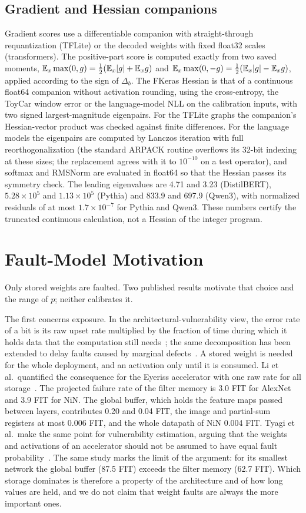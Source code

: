 \subsection{Gradient and Hessian companions}
Gradient scores use a differentiable companion with straight-through requantization (TFLite) or the decoded weights with fixed float32 scales (transformers). The positive-part score is computed exactly from two saved moments, $\mathbb{E}_x\max(0,g)=\tfrac12(\mathbb{E}_x|g|+\mathbb{E}_x g)$ and $\mathbb{E}_x\max(0,-g)=\tfrac12(\mathbb{E}_x|g|-\mathbb{E}_x g)$, applied according to the sign of $\Delta_b$. The FKeras Hessian is that of a continuous float64 companion without activation rounding, using the cross-entropy, the ToyCar window error or the language-model NLL on the calibration inputs, with two signed largest-magnitude eigenpairs. For the TFLite graphs the companion's Hessian-vector product was checked against finite differences. For the language models the eigenpairs are computed by Lanczos iteration with full reorthogonalization (the standard ARPACK routine overflows its 32-bit indexing at these sizes; the replacement agrees with it to $10^{-10}$ on a test operator), and softmax and RMSNorm are evaluated in float64 so that the Hessian passes its symmetry check. The leading eigenvalues are 4.71 and 3.23 (DistilBERT), $5.28\times10^5$ and $1.13\times10^5$ (Pythia) and 833.9 and 697.9 (Qwen3), with normalized residuals of at most $1.7\times10^{-7}$ for Pythia and Qwen3. These numbers certify the truncated continuous calculation, not a Hessian of the integer program.

\section{Fault-Model Motivation}\label{app:faultmotivation}
Only stored weights are faulted. Two published results motivate that choice and the range of $p$; neither calibrates it.

The first concerns exposure. In the architectural-vulnerability view, the error rate of a bit is its raw upset rate multiplied by the fraction of time during which it holds data that the computation still needs~\cite{mukherjee2003avf}; the same decomposition has been extended to delay faults caused by marginal defects~\cite{deutsch2024delayavf}. A stored weight is needed for the whole deployment, and an activation only until it is consumed. Li et al.\ quantified the consequence for the Eyeriss accelerator with one raw rate for all storage~\cite{li2017understanding}. The projected failure rate of the filter memory is 3.0 FIT for AlexNet and 3.9 FIT for NiN. The global buffer, which holds the feature maps passed between layers, contributes 0.20 and 0.04 FIT, the image and partial-sum registers at most 0.006 FIT, and the whole datapath of NiN 0.004 FIT. Tyagi et al.\ make the same point for vulnerability estimation, arguing that the weights and activations of an accelerator should not be assumed to have equal fault probability~\cite{tyagi2023thales}. The same study marks the limit of the argument: for its smallest network the global buffer (87.5 FIT) exceeds the filter memory (62.7 FIT). Which storage dominates is therefore a property of the architecture and of how long values are held, and we do not claim that weight faults are always the more important ones.

